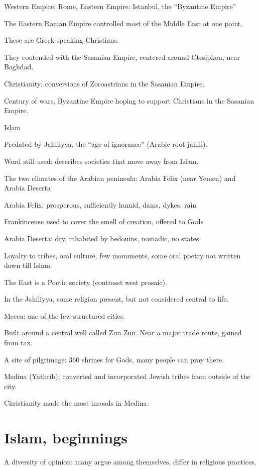 \documentclass[12pt]{article}
\begin{document}
Western Empire: Rome, Eastern Empire: Istanbul, the ``Byzantine Empire''

The Eastern Roman Empire controlled most of the Middle East at one point.

These are Greek-speaking Christians.

They contended with the Sasanian Empire, centered around Ctesiphon, near Baghdad.

Christianity: conversions of Zoroastrians in the Sasanian Empire.

Century of wars, Byzantine Empire hoping to support Christians in the Sasanian Empire.

\noindent
Islam

Predated by Jahiliyya, the ``age of ignorance'' (Arabic root jahili).

Word still used: describes societies that move away from Islam.

The two climates of the Arabian peninsula: Arabia Felix (near Yemen) and Arabia Deserta

Arabia Felix: prosperous, sufficiently humid, dams, dykes, rain

Frankincense used to cover the smell of creation, offered to Gods

Arabia Deserta: dry, inhabited by bedouins, nomadic, no states

Loyalty to tribes, oral culture, few monuments, some oral poetry not written down till Islam.

The East is a Poetic society (contrasst west prosaic).

In the Jahiliyya, some religion present, but not considered central to life.

Mecca: one of the few structured cities.

Built around a central well called Zun Zun.  Near a major trade route, gained from tax.

A site of pilgrimage: 360 shrines for Gods, many people can pray there.

Medina (Yathrib); converted and incorporated Jewish tribes from outside of the city.

Christianity made the most inroads in Medina.

\section{Islam, beginnings}

A diversity of opinion; many argue among themselves, differ in religious practices.
\end{document}
